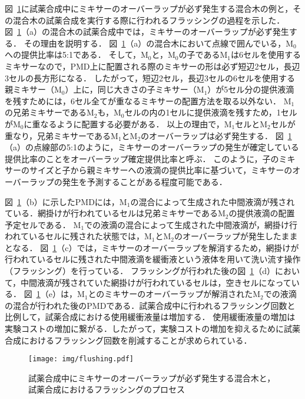     図~\ref{fig:flushing}に試薬合成中にミキサーのオーバーラップが必ず発生する混合木の例と，その混合木の試薬合成を実行する際に行われるフラッシングの過程を示した．
    図~\ref{fig:flushing}（a）の混合木の試薬合成中では，ミキサーのオーバーラップが必ず発生する．
    その理由を説明する．
    図~\ref{fig:flushing}（a）の混合木において点線で囲んでいる，M$_0$への提供比率は5:1である．
    そして，M$_0$と，M$_0$の子であるM$_1$は6セルを使用するミキサーなので，PMD上に配置される際のミキサーの形は必ず短辺2セル，長辺3セルの長方形になる．
    したがって，短辺2セル，長辺3セルの6セルを使用する親ミキサー（M$_0$）上に，同じ大きさの子ミキサー（M$_1$）が5セル分の提供液滴を残すためには，6セル全てが重なるミキサーの配置方法を取る以外ない．
    M$_1$の兄弟ミキサーであるM$_2$も，M$_0$セルの内の1セルに提供液滴を残すため，1セルがM$_0$に重なるように配置する必要がある．
    以上の理由で，M$_1$セルとM$_2$セルが重なり，兄弟ミキサーであるM$_1$とM$_2$のオーバーラップは必ず発生する．
    図~\ref{fig:flushing}（a）の点線部の5:1のように，ミキサーのオーバーラップの発生が確定している提供比率のことをオーバーラップ確定提供比率と呼ぶ．
    このように，子のミキサーのサイズと子から親ミキサーへの液滴の提供比率に基づいて，ミキサーのオーバーラップの発生を予測することがある程度可能である．
    
    図~\ref{fig:flushing}（b）に示したPMDには，M$_1$の混合によって生成された中間液滴が残されている．網掛けが行われているセルは兄弟ミキサーであるM$_2$の提供液滴の配置予定セルである．
    M$_1$での液滴の混合によって生成された中間液滴が，網掛け行われているセルに残された状態では，M$_1$とM$_2$のオーバーラップが発生したままとなる．
    図~\ref{fig:flushing}（c）では，ミキサーのオーバーラップを解消するため，網掛けが行われているセルに残された中間液滴を緩衝液という液体を用いて洗い流す操作（フラッシング）を行っている．
    フラッシングが行われた後の図~\ref{fig:flushing}（d）において，中間液滴が残されていた網掛けが行われているセルは，空きセルになっている．
    図~\ref{fig:flushing}（e）は，M$_1$とのミキサーのオーバーラップが解消されたM$_2$での液滴の混合が行われた後のPMDである．試薬合成中に行われるフラッシング回数と比例して，試薬合成における使用緩衝液量は増加する．
    使用緩衝液量の増加は実験コストの増加に繋がる．したがって，実験コストの増加を抑えるために試薬合成におけるフラッシング回数を削減することが求められている．

 \begin{figure}[tbp]
    \centering\texttt{[image: img/flushing.pdf]}
    \caption{試薬合成中にミキサーのオーバーラップが必ず発生する混合木と，試薬合成におけるフラッシングのプロセス}\label{fig:flushing}
    
\end{figure}

